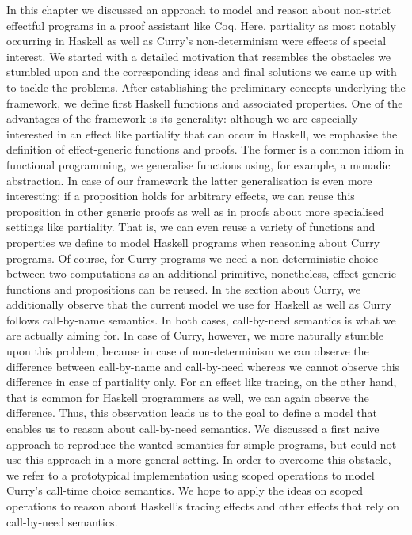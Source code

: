 In this chapter we discussed an approach to model and reason about non\--strict effectful programs in a proof assistant like Coq.
Here, partiality as most notably occurring in Haskell as well as Curry's non\--determinism were effects of special interest.
We started with a detailed motivation that resembles the obstacles we stumbled upon and the corresponding ideas and final solutions we came up with to tackle the problems.
After establishing the preliminary concepts underlying the framework, we define first Haskell functions and associated properties.
One of the advantages of the framework is its generality: although we are especially interested in an effect like partiality that can occur in Haskell, we emphasise the definition of effect\--generic functions and proofs.
The former is a common idiom in functional programming, we generalise functions using, for example, a monadic abstraction.
In case of our framework the latter generalisation is even more interesting: if a proposition holds for arbitrary effects, we can reuse this proposition in other generic proofs as well as in proofs about more specialised settings like partiality.
That is, we can even reuse a variety of functions and properties we define to model Haskell programs when reasoning about Curry programs.
Of course, for Curry programs we need a non\--deterministic choice between two computations as an additional primitive, nonetheless, effect\--generic functions and propositions can be reused.
In the section about Curry, we additionally observe that the current model we use for Haskell as well as Curry follows call\--by\--name semantics.
In both cases, call\--by\--need semantics is what we are actually aiming for.
In case of Curry, however, we more naturally stumble upon this problem, because in case of non\--determinism we can observe the difference between call\--by\--name and call\--by\--need whereas we cannot observe this difference in case of partiality only.
For an effect like tracing, on the other hand, that is common for Haskell programmers as well, we can again observe the difference.
Thus, this observation leads us to the goal to define a model that enables us to reason about call\--by\--need semantics.
We discussed a first naive approach to reproduce the wanted semantics for simple programs, but could not use this approach in a more general setting.
In order to overcome this obstacle, we refer to a prototypical implementation using scoped operations to model Curry's call\--time choice semantics.
We hope to apply the ideas on scoped operations to reason about Haskell's tracing effects and other effects that rely on call\--by\--need semantics.

